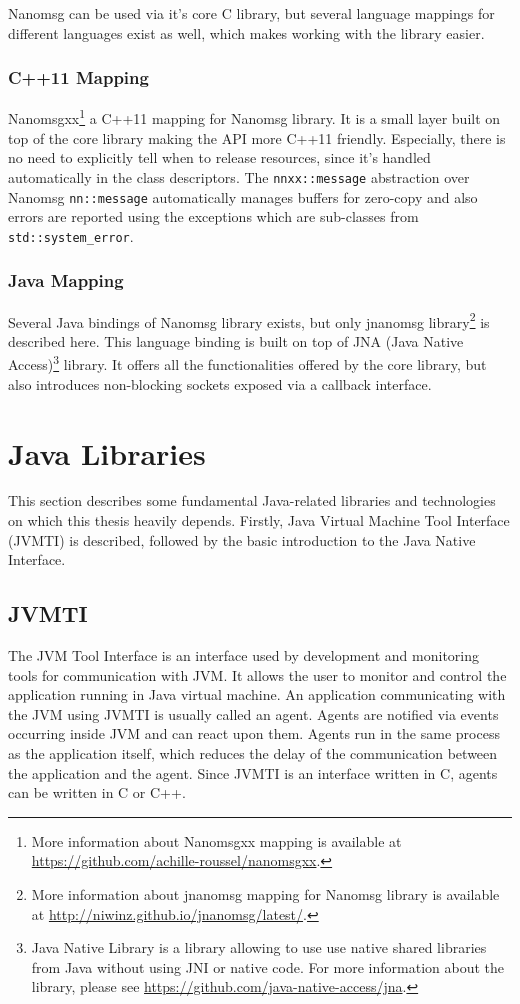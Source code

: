 Nanomsg can be used via it's core C library, but several language mappings for different languages exist as well, which makes working with the library easier.
\subsubsection{C++11 Mapping}
Nanomsgxx\footnote{More information about Nanomsgxx mapping is available at \url{https://github.com/achille-roussel/nanomsgxx}.} a C++11 mapping for Nanomsg library. It is a small layer built on top of the core library making the API more C++11  friendly. Especially, there is no need to explicitly tell when to release resources, since it's handled automatically in the class descriptors. The \texttt{nnxx::message} abstraction over Nanomsg \texttt{nn::message} automatically manages buffers for zero-copy and also errors are reported using the exceptions which are sub-classes from \texttt{std::system\_error}.
\subsubsection{Java Mapping}
Several Java bindings of Nanomsg library exists, but only jnanomsg library\footnote{More information about jnanomsg mapping for Nanomsg library is available at \url{http://niwinz.github.io/jnanomsg/latest/}.}  is described here. This language binding is built on top of JNA (Java Native Access)\footnote{Java Native Library is a library allowing to use use native shared libraries from Java without using JNI or native code. For more information about the library, please see \url{https://github.com/java-native-access/jna}.} library. It offers all the functionalities offered by the core library, but also introduces non-blocking sockets exposed via a callback interface.

\section{Java Libraries}
This section describes some fundamental Java-related libraries and technologies on which this thesis heavily depends. Firstly, Java Virtual Machine Tool Interface (JVMTI) is described, followed by the basic introduction to the Java Native Interface.
\subsection{JVMTI}
\label{JVMTI}
The JVM Tool Interface is an interface used by development and monitoring tools for communication with JVM. It allows the user to monitor and control the application running in Java virtual machine. An application communicating with the JVM using JVMTI is usually called an agent. Agents are notified via events occurring inside JVM and can react upon them. Agents run in the same process as the application itself, which reduces the delay of the communication between the application and the agent. Since JVMTI is an interface written in C, agents can be written in C or C++. 

